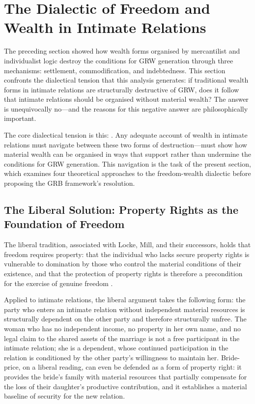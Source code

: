 \section{The Dialectic of Freedom and Wealth in Intimate Relations}
\label{p15:sec:dialectic}

\noindent
The preceding section showed how wealth forms organised by mercantilist and individualist logic destroy the conditions for GRW generation through three mechanisms: settlement, commodification, and indebtedness. This section confronts the dialectical tension that this analysis generates: if traditional wealth forms in intimate relations are structurally destructive of GRW, does it follow that intimate relations should be organised without material wealth? The answer is unequivocally no---and the reasons for this negative answer are philosophically important.

The core dialectical tension is this: . Any adequate account of wealth in intimate relations must navigate between these two forms of destruction---must show how material wealth can be organised in ways that support rather than undermine the conditions for GRW generation. This navigation is the task of the present section, which examines four theoretical approaches to the freedom-wealth dialectic before proposing the GRB framework's resolution.

\subsection{The Liberal Solution: Property Rights as the Foundation of Freedom}
\label{p15:subsec:liberal}

\noindent
The liberal tradition, associated with Locke, Mill, and their successors, holds that freedom requires property: that the individual who lacks secure property rights is vulnerable to domination by those who control the material conditions of their existence, and that the protection of property rights is therefore a precondition for the exercise of genuine freedom \parencite{sen1999}.

Applied to intimate relations, the liberal argument takes the following form: the party who enters an intimate relation without independent material resources is structurally dependent on the other party and therefore structurally unfree. The woman who has no independent income, no property in her own name, and no legal claim to the shared assets of the marriage is not a free participant in the intimate relation; she is a dependent, whose continued participation in the relation is conditioned by the other party's willingness to maintain her. Bride-price, on a liberal reading, can even be defended as a form of property right: it provides the bride's family with material resources that partially compensate for the loss of their daughter's productive contribution, and it establishes a material baseline of security for the new relation.

